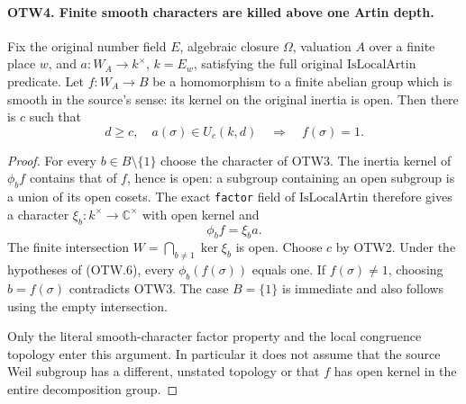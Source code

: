 \paragraph{OTW4. Finite smooth characters are killed above one Artin depth.}
\label{claim:OTW4}
Fix the original number field $E$, algebraic closure $\Omega$,
valuation $A$ over a finite place $w$, and
$a:W_A\to k^\times$, $k=E_w$, satisfying the full original
$\mathrm{IsLocalArtin}$ predicate.  Let $f:W_A\to B$ be a
homomorphism to a finite abelian group which is smooth in the
source's sense: its kernel on the original inertia is open.
Then there is $c$ such that
\[
 d\geq c,\quad a(\sigma)\in U_c(k,d)
                 \quad\Longrightarrow\quad f(\sigma)=1.
                 \tag{OTW.6}
\]
\begin{proof}
For every $b\in B\setminus\{1\}$ choose the character of OTW3.
The inertia kernel of $\phi_b f$ contains that of $f$, hence is
open: a subgroup containing an open subgroup is a union of its open
cosets.  The exact \texttt{factor} field of $\mathrm{IsLocalArtin}$
therefore gives a character $\xi_b:k^\times\to\mathbb C^\times$
with open kernel and
\[
                        \phi_b f=\xi_b a.
                        \tag{OTW.7}
\]
The finite intersection $W=\bigcap_{b\ne1}\ker\xi_b$ is open.
Choose $c$ by OTW2.  Under the hypotheses of (OTW.6), every
$\phi_b(f(\sigma))$ equals one.  If $f(\sigma)\ne1$, choosing
$b=f(\sigma)$ contradicts OTW3.  The case $B=\{1\}$ is
immediate and also follows using the empty intersection.

Only the literal smooth-character factor property and the local
congruence topology enter this argument.  In particular it does not
assume that the source Weil subgroup has a different, unstated
topology or that $f$ has open kernel in the entire decomposition group.
\end{proof}

